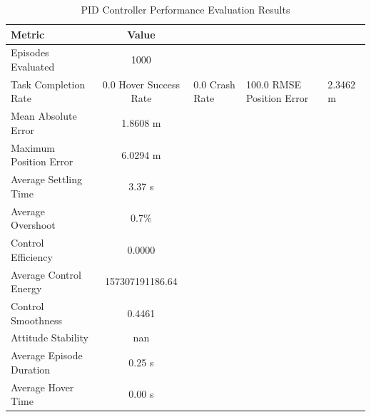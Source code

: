 \begin{table}[htbp]
\centering
\caption{PID Controller Performance Evaluation Results}
\label{tab:pid_performance}
\begin{tabular}{|l|c|}
\hline
\textbf{Metric} & \textbf{Value} \\
\hline
Episodes Evaluated & 1000 \\
Task Completion Rate & 0.0%
Hover Success Rate & 0.0%
Crash Rate & 100.0%
\hline
RMSE Position Error & 2.3462 m \\
Mean Absolute Error & 1.8608 m \\
Maximum Position Error & 6.0294 m \\
Average Settling Time & 3.37 s \\
Average Overshoot & 0.7\% \\
\hline
Control Efficiency & 0.0000 \\
Average Control Energy & 157307191186.64 \\
Control Smoothness & 0.4461 \\
Attitude Stability & nan \\
\hline
Average Episode Duration & 0.25 s \\
Average Hover Time & 0.00 s \\
\hline
\end{tabular}
\end{table}
